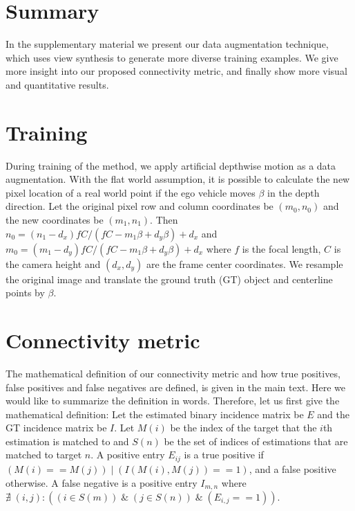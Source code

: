 \documentclass[10pt,twocolumn,letterpaper]{article}
\begin{document}
{\small


}

\newpage
{}

\section{Summary}

In the supplementary material we present our data augmentation technique, which uses view synthesis to generate more diverse training examples. We give more insight into our proposed connectivity metric, and finally show more visual and quantitative results.

\section{Training}

During training of the method, we apply artificial depthwise motion as a data augmentation. With the flat world assumption, it is possible to calculate the new pixel location of a real world point if the ego vehicle moves $\beta$ in the depth direction. Let the original pixel row and column coordinates be $(m_0, n_0)$ and the new coordinates be $(m_1, n_1)$. Then $n_0 = (n_1-d_x)fC/(fC - m_1\beta + d_y\beta) + d_x$ and $m_0 = (m_1-d_y)fC/(fC - m_1\beta + d_y\beta) + d_x$ where $f$ is the focal length, $C$ is the camera height and $(d_x,d_y)$ are the frame center coordinates. We resample the original image and translate the ground truth (GT) object and centerline points by $\beta$. 


\section{Connectivity metric}

The mathematical definition of our connectivity metric and how true positives, false positives and false negatives are defined, is given in the main text. Here we would like to summarize the definition in words. Therefore, let us first give the mathematical definition:
Let the estimated binary incidence matrix be $E$ and the GT incidence matrix be $I$. Let $M(i)$ be the index of the target that the $i$th estimation is matched to and $S(n)$ be the set of indices of estimations that are matched to target $n$. A positive entry $E_{ij}$ is a true positive if $(M(i) == M(j)) \;|\; (I(M(i), M(j)) == 1)$, and a false positive otherwise. A false negative is a positive entry $I_{m,n}$ where $\nexists \;(i,j) : ((i \in S(m))\; \& \;(j \in S(n))\; \& \;(E_{i,j}==1))$. 
\end{document}

